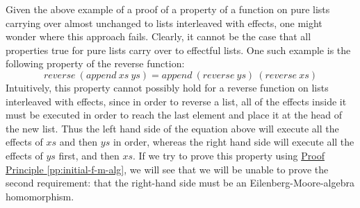 \documentclass{jfp1}
\newcommand{\proofprinref}[1]{\hyperref[#1]{Proof Principle \ref*{#1}}}
\begin{document}
Given the above example of a proof of a property of a function on pure
lists carrying over almost unchanged to lists interleaved with
effects, one might wonder where this approach fails. Clearly, it
cannot be the case that all properties true for pure lists carry over
to effectful lists. One such example is the following property of the
reverse function:
\begin{displaymath}
  \mathit{reverse}~(\mathit{append}~\mathit{xs}~\mathit{ys}) = \mathit{append}~(\mathit{reverse}~\mathit{ys})~(\mathit{reverse}~\mathit{xs})
\end{displaymath}
Intuitively, this property cannot possibly hold for a reverse function
on lists interleaved with effects, since in order to reverse a list,
all of the effects inside it must be executed in order to reach the
last element and place it at the head of the new list. Thus the left
hand side of the equation above will execute all the effects of
$\mathit{xs}$ and then $\mathit{ys}$ in order, whereas the right hand
side will execute all the effects of $\mathit{ys}$ first, and then
$\mathit{xs}$. If we try to prove this property using
\proofprinref{pp:initial-f-m-alg}, we will see that we will be unable
to prove the second requirement: that the right-hand side must be an
Eilenberg-Moore-algebra homomorphism.
\end{document}
